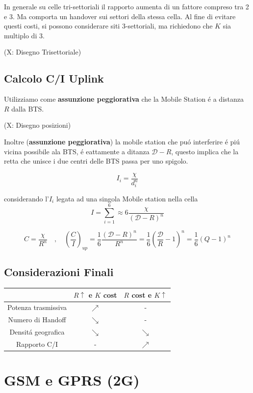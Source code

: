 \documentclass{article}
\begin{document}
In generale su celle tri-settoriali il rapporto aumenta di un fattore compreso tra 2 e 3. Ma comporta un handover sui settori della stessa cella. Al fine di evitare questi costi, si possono considerare siti 3-settoriali, ma richiedono che $K$ sia multiplo di 3.

(X: Disegno Trisettoriale)

\subsection{Calcolo C/I Uplink}
Utilizziamo come \textbf{assunzione peggiorativa} che la Mobile Station \'e a distanza $R$ dalla BTS.

(X: Disegno posizioni)

Inoltre (\textbf{assunzione peggiorativa}) la mobile station che pu\'o interferire \'e pi\'u vicina possibile ala BTS, \'e eattamente a ditanza $\mathcal{D} - R$, questo implica che la retta che unisce i due centri delle BTS passa per uno spigolo.

\[I_i = \frac{\chi}{d_i^n} \]

considerando l'$I_i$ legata ad una singola Mobile station nella cella
\[ I = \sum\limits_{i=1}^6 \approx 6\frac{\chi}{{(\mathcal{D} - R)}^n} \]

\[ C = \frac{\chi}{R^n} \quad,\quad {\left(\frac{C}{I}\right)}_{up}
    = \frac{1}{6}\frac{{(\mathcal{D} - R)}^n}{R^n}
    = \frac{1}{6}\left(\frac{\mathcal{D}}{R} -1 \right)^n = \frac{1}{6}(Q - 1)^n
\]

\subsection{Considerazioni Finali}
\begin{center}
\begin{tabular}{c|c|c}
    & $R\uparrow$ e $K$ cost & $R$ cost e $K\uparrow$\\
    \hline
    Potenza trasmissiva  & {\color{red}$\nearrow$}  & -\\
    Numero di Handoff    & {\color{green}$\searrow$}& -\\
    Densit\'a geografica & {\color{red}$\searrow$}  & {\color{red}$\searrow$}\\
    Rapporto C/I         &                         -& {\color{green}$\nearrow$}
\end{tabular}
\end{center}

\section{GSM e GPRS (2G)}
\end{document}
